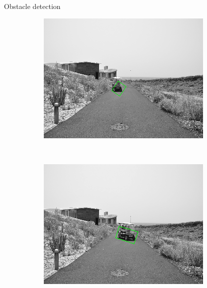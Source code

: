 \begin{frame}{Obstacle detection}
\begin{figure}[h!]
\begin{subfigure}[b]{0.24\columnwidth}
	  \includegraphics[width=\textwidth]{sequence/seq5}\label{fig:seq5}
      \end{subfigure}%
      ~
      \begin{subfigure}[b]{0.24\columnwidth}
	  \includegraphics[width=\textwidth]{sequence/seq6}\label{fig:seq6}
      \end{subfigure}%
      ~
      \begin{subfigure}[b]{0.24\columnwidth}

\end{subfigure}
\end{figure}
\end{frame}
